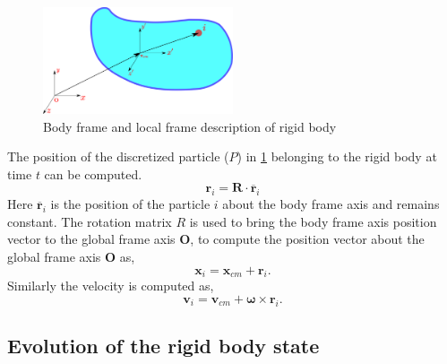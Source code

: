 \documentclass[preprint,12pt]{elsarticle}
\newcommand{\teng}[1]{\ensuremath{\boldsymbol{#1}}}
\newcommand{\ten}[1]{\ensuremath{\mathbf{#1}}}
\begin{document}
\begin{figure}[!htpb]
  \centering
  \includegraphics[width=0.5\textwidth]{images/rigid_body/rigid_body}
  \caption{Body frame and local frame description of rigid body}
  \label{fig:gloabl_body_frame_rb}
\end{figure}
The position of the discretized particle ($P$) in
\cref{fig:gloabl_body_frame_rb} belonging to the rigid body at time $t$ can be
computed.
\begin{equation}
  \label{eq:rb_particle_pos_update}
  \ten{r}_i = \ten{R} \cdot \overline{\ten{r}}_{i}
\end{equation}
Here $\overline{\ten{r}}_{i}$ is the position of the particle $i$ about the
body frame axis and remains constant. The rotation matrix $R$ is used to bring
the body frame axis position vector to the global frame axis $\ten{O}$, to
compute the position vector about the global frame axis $\ten{O}$ as,
\begin{equation}
  \label{eq:rb_particle_pos_update}
  \ten{x}_i = \ten{x}_{cm} + \ten{r}_{i}.
\end{equation}
Similarly the velocity is computed as,
\begin{equation}
  \label{eq:rb_particle_vel_update}
  \ten{v}_i = \ten{v}_{cm} + \teng{\omega} \times \ten{r}_{i}.
\end{equation}


\subsection{Evolution of the rigid body state}
\end{document}
